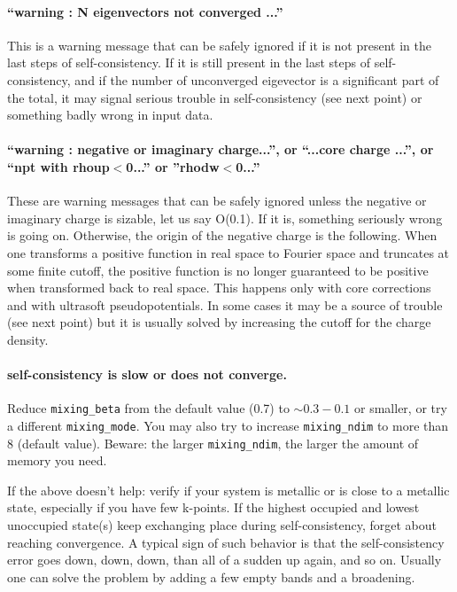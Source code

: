 \documentclass[12pt,a4paper]{article}
\begin{document}
\paragraph{``warning : N eigenvectors not converged ...''}

This is a warning message that can be safely ignored if it
is not present in the last steps of self-consistency. If it 
is still present in the last steps of self-consistency, and
if the number of unconverged eigevector is a significant 
part of the total, it may signal serious trouble in self-consistency
(see next point) or something badly wrong in input data.

\paragraph{``warning : negative or imaginary charge...'', or
``...core charge ...'', or ``npt with rhoup$<$0...'' or ''rhodw$<$0...'' }

These are warning messages that can be safely ignored unless the 
negative or imaginary charge is sizable,
let us say {\cal O(0.1)}. If it is, something seriously 
wrong is going on. Otherwise, the origin of the negative
charge is the following. When one transforms a positive 
function in real space to Fourier space and truncates at 
some finite cutoff, the positive function is no longer 
guaranteed to be positive when transformed back to real 
space. This happens only with core corrections and with 
ultrasoft pseudopotentials. In some cases it may be a 
source of trouble (see next point) but it is usually 
solved by increasing the cutoff for the charge density.

\paragraph{self-consistency is slow or does not converge.}

Reduce \texttt{mixing\_beta} from the default value (0.7) to $\sim
0.3-0.1$ or smaller, or try a different \texttt{mixing\_mode}.
You may also try to increase \texttt{mixing\_ndim} to more than 8
(default value).
Beware: the larger \texttt{mixing\_ndim}, the larger the amount of
memory you need.

If the above doesn't help: verify if your system is metallic or is
close to a metallic state, especially if you have few k-points.
If the highest occupied and lowest unoccupied state(s) keep exchanging
place during self-consistency, forget about reaching convergence. A 
typical sign of such behavior is that the self-consistency error 
goes down, down, down, than all of a sudden up again, and so on.
Usually one can solve the problem by adding a few empty bands and a
broadening.
\end{document}
